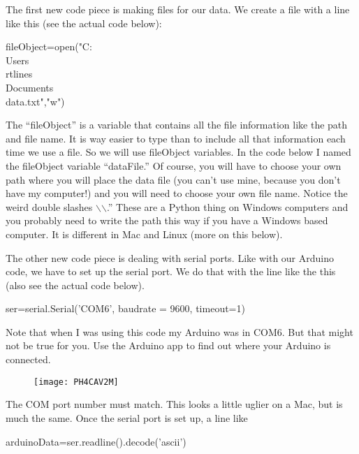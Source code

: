 The first new code piece is making files for our data. We create a file with a line like this (see the actual code below):
\vspace{.1in}

\begin{python}
	fileObject=open("C:\\Users\\rtlines\\Documents\\data.txt","w")	
\end{python}
\vspace{.1in}

The ``fileObject'' is a variable that contains all the file information like the path and file name. It is way easier to type than to include all that information each time we use a file. So we will use fileObject variables. In the code below I named the fileObject variable ``dataFile.'' Of course, you will have to choose your own path where you will place the data file (you can't use mine, because you don't have my computer!) and you will need to choose your own file name. Notice the weird double slashes $\backslash$$\backslash$.'' These are a Python thing on Windows computers and you probably need to write the path this way if you have a Windows based computer. It is different in Mac and Linux (more on this below).

The other new code piece is dealing with serial ports. Like with our Arduino code, we have to set up the serial port. We do that with the line like the this (also see the actual code below).

\vspace{.1in}
\begin{python}
	ser=serial.Serial('COM6', baudrate = 9600, timeout=1)
\end{python}
\vspace{.1in}

Note that when I was using this code my Arduino was in COM6. But that might not be true for you. Use the Arduino app to find out where your Arduino is connected. 

\begin{figure}[h!]
	\texttt{[image: PH4CAV2M]}
\end{figure}

The COM port number must match. This looks a little uglier on a Mac, but is much the same. Once the serial port is set up, a line like 

\vspace{.1in}
\begin{python}
	arduinoData=ser.readline().decode('ascii')
\end{python}
\vspace{.1in}

